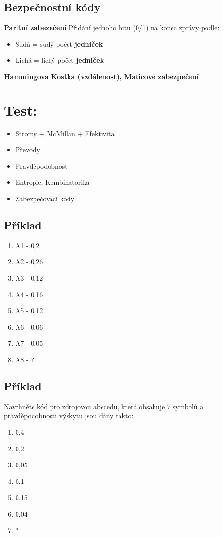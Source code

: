 \documentclass{article}
\begin{document}
\subsection{Bezpečnostní kódy}
\textbf{Paritní zabezečení}
Přidání jednoho bitu (0/1) na konec zprávy podle:
\begin{itemize}
    \item Sudá = sudý počet \textbf{jedniček}
    \item Lichá = lichý počet \textbf{jedniček}
\end{itemize}
\textbf{Hammingova Kostka (vzdálenost), Maticové zabezpečení}

\section{Test:}
\begin{itemize}
    \item Stromy + McMillan + Efektivita
    \item Převody
    \item Pravděpodobnost
    \item Entropie, Kombinatorika
    \item Zabezpečovací kódy
\end{itemize}

\subsection{Příklad}
\begin{enumerate}
    \item A1 - 0,2
    \item A2 - 0,26
    \item A3 - 0,12
    \item A4 - 0,16
    \item A5 - 0,12
    \item A6 - 0,06
    \item A7 - 0,05
    \item A8 - ?
\end{enumerate}

\subsection{Příklad}
Navrhněte kód pro zdrojovou abecedu, která obsahuje 7 symbolů a pravděpodobnosti výskytu jsou dány takto:
\begin{enumerate}
    \item 0,4
    \item 0,2
    \item 0,05
    \item 0,1
    \item 0,15
    \item 0,04
    \item ?
\end{enumerate}
\end{document}
